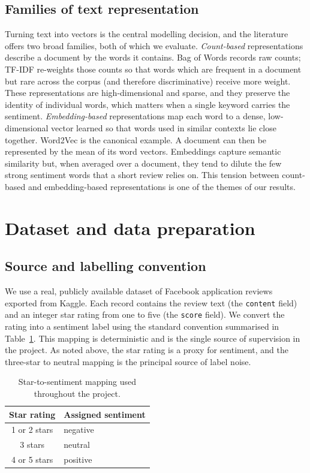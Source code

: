 \documentclass[11pt,a4paper]{article}
\begin{document}
\subsection{Families of text representation}
Turning text into vectors is the central modelling decision, and the literature offers
two broad families, both of which we evaluate.
\emph{Count-based} representations describe a document by the words it contains. Bag of
Words records raw counts; TF-IDF re-weights those counts so that words which are
frequent in a document but rare across the corpus (and therefore discriminative)
receive more weight. These representations are high-dimensional and sparse, and they
preserve the identity of individual words, which matters when a single keyword carries
the sentiment.
\emph{Embedding-based} representations map each word to a dense, low-dimensional vector
learned so that words used in similar contexts lie close together. Word2Vec is the
canonical example. A document can then be represented by the mean of its word vectors.
Embeddings capture semantic similarity but, when averaged over a document, they tend to
dilute the few strong sentiment words that a short review relies on. This tension
between count-based and embedding-based representations is one of the themes of our
results.

\section{Dataset and data preparation}
\label{sec:data}
\subsection{Source and labelling convention}
We use a real, publicly available dataset of Facebook application reviews exported from
Kaggle. Each record contains the review text (the \texttt{content} field) and an integer
star rating from one to five (the \texttt{score} field). We convert the rating into a
sentiment label using the standard convention summarised in Table~\ref{tab:starmap}.
This mapping is deterministic and is the single source of supervision in the project.
As noted above, the star rating is a proxy for sentiment, and the three-star to neutral
mapping is the principal source of label noise.

\begin{table}[H]
\centering
\begin{tabular}{cl}
\toprule
\textbf{Star rating} & \textbf{Assigned sentiment} \\
\midrule
1 or 2 stars & negative \\
3 stars      & neutral \\
4 or 5 stars & positive \\
\bottomrule
\end{tabular}
\caption{Star-to-sentiment mapping used throughout the project.}
\label{tab:starmap}
\end{table}
\end{document}

